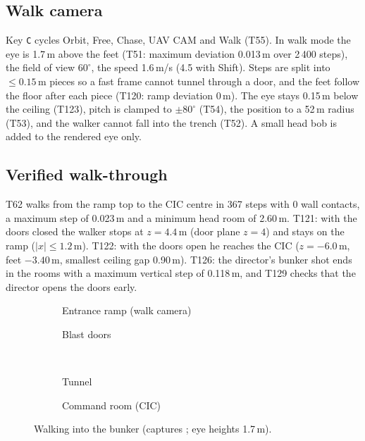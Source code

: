 \subsection{Walk camera}
Key \texttt{C} cycles Orbit, Free, Chase, UAV CAM and Walk (T55). In walk mode the eye is 1.7\,m above the feet (T51: maximum deviation 0.013\,m over 2\,400 steps), the field of
view $60^\circ$, the speed 1.6\,m/s (4.5 with Shift). Steps are split into $\le0.15$\,m pieces so a fast frame cannot tunnel through a door, and the feet follow the floor after each piece
(T120: ramp deviation 0\,m). The eye stays 0.15\,m below the ceiling (T123), pitch is clamped to $\pm80^\circ$ (T54), the position to a 52\,m radius (T53), and the walker cannot fall into the trench (T52).
A small head bob is added to the rendered eye only.

\subsection{Verified walk-through}
T62 walks from the ramp top to the CIC centre in 367 steps with 0 wall contacts, a maximum step of 0.023\,m and a minimum head room of 2.60\,m. T121: with the doors closed the walker stops at
$z=4.4$\,m (door plane $z=4$) and stays on the ramp ($|x|\le1.2$\,m). T122: with the doors open he reaches the CIC ($z=-6.0$\,m, feet $-3.40$\,m, smallest ceiling gap 0.90\,m).
T126: the director's bunker shot ends in the rooms with a maximum vertical step of 0.118\,m, and T129 checks that the director opens the doors early.

\begin{figure}[h]
  \centering
  \begin{subfigure}{0.49\linewidth}\caption{Entrance ramp (walk camera)}\end{subfigure}
  \begin{subfigure}{0.49\linewidth}\caption{Blast doors}\end{subfigure}\\[1mm]
  \begin{subfigure}{0.49\linewidth}\caption{Tunnel}\end{subfigure}
  \begin{subfigure}{0.49\linewidth}\caption{Command room (CIC)}\end{subfigure}
  \caption{Walking into the bunker (captures ; eye heights 1.7\,m).}
  \label{fig:bunkerwalk}
\end{figure}
